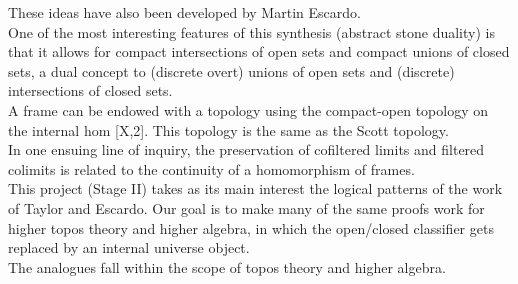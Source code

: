\documentclass{book}
\begin{document}
These ideas have also been developed by Martin Escardo.\\

One of the most interesting features of this synthesis (abstract stone duality) is that it allows for compact intersections of open sets and compact unions of closed sets, a dual concept to (discrete overt) unions of open sets and (discrete) intersections of closed sets.\\

A frame can be endowed with a topology using the compact-open topology on the internal hom [X,2]. This topology is the same as the Scott topology.\\

In one ensuing line of inquiry, the preservation of cofiltered limits and filtered colimits is related to the continuity of a homomorphism of frames.\\

This project (Stage II) takes as its main interest the logical patterns of the work of Taylor and Escardo. Our goal is to make many of the same proofs work for higher topos theory and higher algebra, in which the open/closed classifier gets replaced by an internal universe object.\\ 

The analogues fall within the scope of topos theory and higher algebra.\\
\end{document}
